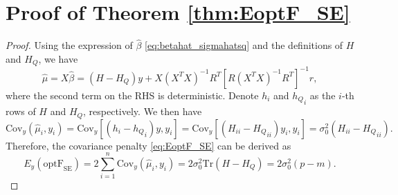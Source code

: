 \section{Proof of Theorem \ref{thm:EoptF_SE}}
\begin{proof}
Using the expression of $\hat\beta$ \eqref{eq:betahat_sigmahatsq} and the definitions of $H$ and $H_Q$, we have
\begin{equation*}
\hat{\mu} = X\hat{\beta} = (H-H_Q)y + X(X^T X)^{-1} R^T \left[ R(X^TX)^{-1}R^T  \right]^{-1}r,
\end{equation*}
where the second term on the RHS is deterministic. Denote $h_i$ and ${h_Q}_i$ as the $i$-th rows of $H$ and $H_Q$, respectively. We then have
\begin{equation*}
\text{Cov}_y \left(\hat{\mu}_i, y_i \right) = \text{Cov}_y \left[ (h_i-{h_Q}_i)y, y_i  \right] = \text{Cov}_y \left[ (H_{ii}-{H_Q}_{ii})y_i, y_i \right] = \sigma_0^2 (H_{ii}-{H_Q}_{ii}).
\end{equation*}
Therefore, the covariance penalty \eqref{eq:EoptF_SE} can be derived as
\begin{equation*}
E_y (\text{optF}_\text{SE}) = 2 \sum_{i=1}^n \text{Cov}_y (\hat\mu_i,y_i) = 2 \sigma_0^2 \text{Tr}(H-H_Q) = 2 \sigma_0^2 (p-m).
\end{equation*}
\end{proof}

